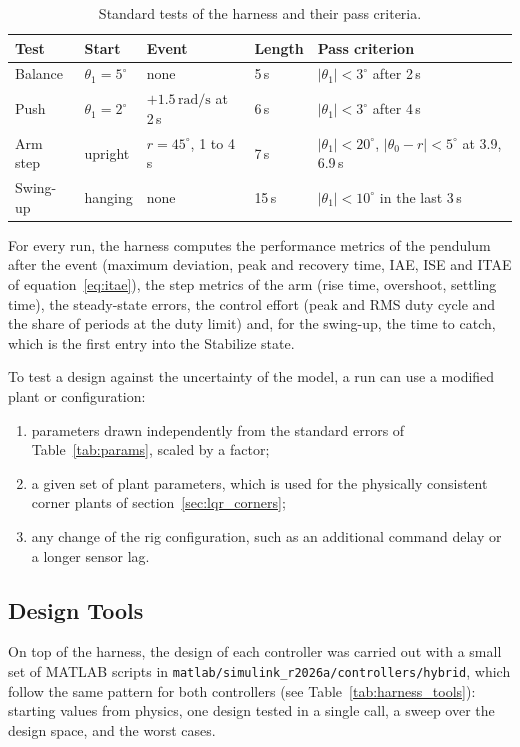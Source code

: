 \documentclass[a4paper,11pt]{article}
\begin{document}
\begin{table}[h]
\centering
\caption{Standard tests of the harness and their pass criteria.}
\label{tab:harness_tests}
\small
\begin{tabular}{@{}lllll@{}}
\toprule
Test & Start & Event & Length & Pass criterion \\
\midrule
Balance & $\theta_1 = 5^\circ$ & none & 5\,s & $|\theta_1| < 3^\circ$ after 2\,s \\
Push & $\theta_1 = 2^\circ$ & $+1.5\,\mathrm{rad/s}$ at 2\,s & 6\,s & $|\theta_1| < 3^\circ$ after 4\,s \\
Arm step & upright & $r = 45^\circ$, 1 to 4\,s & 7\,s & $|\theta_1| < 20^\circ$, $|\theta_0 - r| < 5^\circ$ at 3.9, 6.9\,s \\
Swing-up & hanging & none & 15\,s & $|\theta_1| < 10^\circ$ in the last 3\,s \\
\bottomrule
\end{tabular}
\end{table}

For every run, the harness computes the performance metrics of the pendulum after the event (maximum deviation, peak and recovery time, IAE, ISE and ITAE of equation~\ref{eq:itae}), the step metrics of the arm (rise time, overshoot, settling time), the steady-state errors, the control effort (peak and RMS duty cycle and the share of periods at the duty limit) and, for the swing-up, the time to catch, which is the first entry into the Stabilize state.

To test a design against the uncertainty of the model, a run can use a modified plant or configuration:
\begin{enumerate}
  \item parameters drawn independently from the standard errors of Table~\ref{tab:params}, scaled by a factor;
  \item a given set of plant parameters, which is used for the physically consistent corner plants of section~\ref{sec:lqr_corners};
  \item any change of the rig configuration, such as an additional command delay or a longer sensor lag.
\end{enumerate}

\subsection{Design Tools}
\label{sec:harness_tools}
On top of the harness, the design of each controller was carried out with a small set of MATLAB scripts in \nolinkurl{matlab/simulink_r2026a/controllers/hybrid}, which follow the same pattern for both controllers (see Table~\ref{tab:harness_tools}): starting values from physics, one design tested in a single call, a sweep over the design space, and the worst cases.
\end{document}
